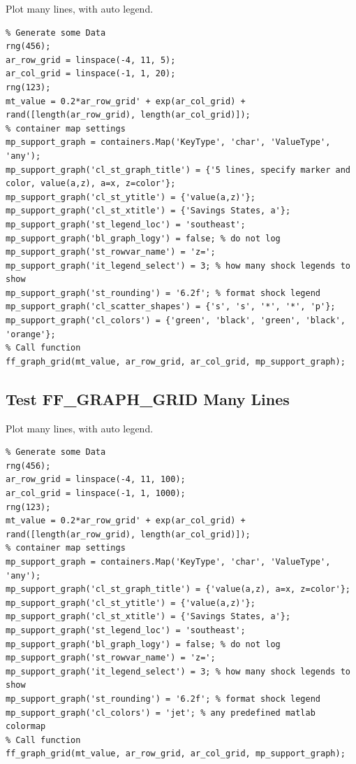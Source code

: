 \documentclass[
]{book}
\begin{document}
Plot many lines, with auto legend.

\begin{verbatim}
% Generate some Data
rng(456);
ar_row_grid = linspace(-4, 11, 5);
ar_col_grid = linspace(-1, 1, 20);
rng(123);
mt_value = 0.2*ar_row_grid' + exp(ar_col_grid) + rand([length(ar_row_grid), length(ar_col_grid)]);
% container map settings
mp_support_graph = containers.Map('KeyType', 'char', 'ValueType', 'any');
mp_support_graph('cl_st_graph_title') = {'5 lines, specify marker and color, value(a,z), a=x, z=color'};
mp_support_graph('cl_st_ytitle') = {'value(a,z)'};
mp_support_graph('cl_st_xtitle') = {'Savings States, a'};
mp_support_graph('st_legend_loc') = 'southeast';
mp_support_graph('bl_graph_logy') = false; % do not log
mp_support_graph('st_rowvar_name') = 'z=';
mp_support_graph('it_legend_select') = 3; % how many shock legends to show
mp_support_graph('st_rounding') = '6.2f'; % format shock legend
mp_support_graph('cl_scatter_shapes') = {'s', 's', '*', '*', 'p'};
mp_support_graph('cl_colors') = {'green', 'black', 'green', 'black', 'orange'};
% Call function
ff_graph_grid(mt_value, ar_row_grid, ar_col_grid, mp_support_graph);
\end{verbatim}

\hypertarget{test-ff_graph_grid-many-lines}{%
\subsection{Test FF\_GRAPH\_GRID Many Lines}\label{test-ff_graph_grid-many-lines}}

Plot many lines, with auto legend.

\begin{verbatim}
% Generate some Data
rng(456);
ar_row_grid = linspace(-4, 11, 100);
ar_col_grid = linspace(-1, 1, 1000);
rng(123);
mt_value = 0.2*ar_row_grid' + exp(ar_col_grid) + rand([length(ar_row_grid), length(ar_col_grid)]);
% container map settings
mp_support_graph = containers.Map('KeyType', 'char', 'ValueType', 'any');
mp_support_graph('cl_st_graph_title') = {'value(a,z), a=x, z=color'};
mp_support_graph('cl_st_ytitle') = {'value(a,z)'};
mp_support_graph('cl_st_xtitle') = {'Savings States, a'};
mp_support_graph('st_legend_loc') = 'southeast';
mp_support_graph('bl_graph_logy') = false; % do not log
mp_support_graph('st_rowvar_name') = 'z=';
mp_support_graph('it_legend_select') = 3; % how many shock legends to show
mp_support_graph('st_rounding') = '6.2f'; % format shock legend
mp_support_graph('cl_colors') = 'jet'; % any predefined matlab colormap
% Call function
ff_graph_grid(mt_value, ar_row_grid, ar_col_grid, mp_support_graph);
\end{verbatim}
\end{document}
